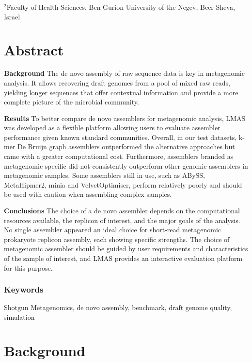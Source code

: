 $^2$Faculty of Health Sciences, Ben-Gurion University of the Negev, Beer-Sheva, Israel

\section{Abstract}

\textbf{Background }The de novo assembly of raw sequence data is key in metagenomic analysis. It allows recovering draft genomes from a pool of mixed raw reads, yielding longer sequences that offer contextual information and provide a more complete picture of the microbial community.

\textbf{Results} To better compare de novo assemblers for metagenomic analysis, LMAS was developed as a flexible platform allowing users to evaluate assembler performance given known standard communities. Overall, in our test datasets, k-mer De Bruijn graph assemblers outperformed the alternative approaches but came with a greater computational cost. Furthermore, assemblers branded as metagenomic specific did not consistently outperform other genomic assemblers in metagenomic samples. Some assemblers still in use, such as ABySS, MetaHipmer2, minia and VelvetOptimiser, perform relatively poorly and should be used with caution when assembling complex samples. 

\textbf{Conclusions} The choice of a de novo assembler depends on the computational resources available, the replicon of interest, and the major goals of the analysis. No single assembler appeared an ideal choice for short-read metagenomic prokaryote replicon assembly, each showing specific strengths. The choice of metagenomic assembler should be guided by user requirements and characteristics of the sample of interest, and LMAS provides an interactive evaluation platform for this purpose. 

\subsubsection{Keywords}

Shotgun Metagenomics, de novo assembly, benchmark, draft genome quality, simulation

\section{Background}

